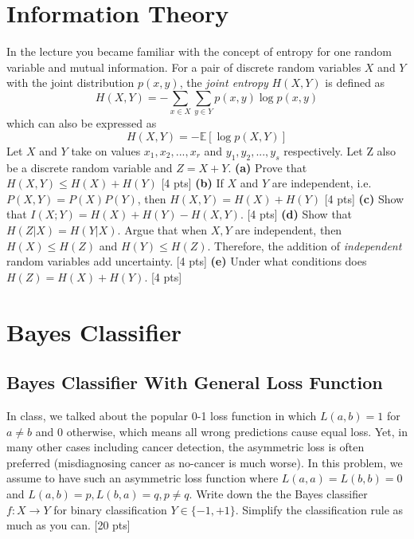 \documentclass[twoside,10pt]{article}
\begin{document}
\section{Information Theory}
In the lecture you became familiar with the concept of entropy for one random variable and mutual information. For a pair of discrete random variables $X$ and $Y$ with the joint distribution $p(x,y)$, the \emph{joint entropy} $H(X,Y)$ is defined as
\begin{equation}
H(X,Y)=-\sum_{x\in X}\sum_{y\in Y}{p(x,y)\log p(x,y)}
\end{equation}
which can also be expressed as
\begin{equation}
H(X,Y)=-\mathbb{E}[\log p(X,Y)]
\end{equation}
Let $X$ and $Y$ take on values $x_1,x_2,...,x_r$ and $y_1,y_2,...,y_s$ respectively. Let Z also be a discrete random variable and $Z=X+Y$.
\newline
\newline
\textbf{(a)} Prove that $H(X,Y)\leq H(X)+H(Y)$ [4 pts] \newline\newline
\textbf{(b)} If $X$ and $Y$ are independent, i.e. $P(X,Y)=P(X)P(Y)$, then $H(X,Y)=H(X)+H(Y)$ [4 pts] \newline\newline
\textbf{(c)} Show that $I(X;Y)=H(X)+H(Y)-H(X,Y)$. [4 pts] \newline\newline
\textbf{(d)} Show that $H(Z|X)=H(Y|X)$. Argue that when $X,Y$ are independent, then $H(X) \leq H(Z)$ and $H(Y) \leq H(Z)$. Therefore, the addition of \emph{independent} random variables add uncertainty. [4 pts] \newline\newline
\textbf{(e)} Under what conditions does $H(Z)=H(X)+H(Y)$. [4 pts] 

\vspace{1cm}

\section{Bayes Classifier}
\subsection{\label{bcwglf} Bayes Classifier With General Loss Function}
In class, we talked about the popular 0-1 loss function in which $L(a,b) = 1$ for $a\neq b$ and 0 otherwise, which means all wrong predictions cause equal loss. Yet, in many other cases including cancer detection, the asymmetric loss is often preferred (misdiagnosing cancer as no-cancer is much worse). In this problem, we assume to have such an asymmetric loss function where $L(a,a) = L(b,b) = 0$ and $L(a,b)=p, L(b,a) = q, p\neq q$. Write down
the the Bayes classifier $f:X\rightarrow Y$ for binary
classification $Y\in\{-1,+1\}$. Simplify the classification rule as much as you can. [20
pts]
\end{document}
